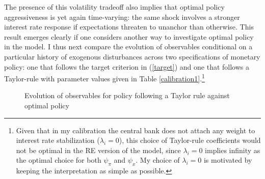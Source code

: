 \documentclass[11pt]{article}
\def \myFigPath {../../figures/}
\renewcommand{\[}{\begin{equation}}
\renewcommand{\]}{\end{equation}}
\def\fignamePEAobsTR{implement_anchTC_obs_TR_approx29_Jul_2020}
\def\fignamePEAobsAnch{implement_anchTC_obs_approx17_Jul_2020}
\begin{document}
The presence of this volatility tradeoff also implies that optimal policy aggressiveness is yet again time-varying: the same shock involves a stronger interest rate response if expectations threaten to unanchor than otherwise. This result emerges clearly if one considers another way to investigate optimal policy in the model. I thus next compare the evolution of observables conditional on a particular history of exogenous disturbances across two specifications of monetary policy: one that follows the target criterion in (\ref{target}) and one that follows a Taylor-rule with parameter values given in Table \ref{calibration1}.\footnote{Given that in my calibration the central bank does not attach any weight to interest rate stabilization ($\lambda_i=0$), this choice of Taylor-rule coefficients would not be optimal in the RE version of the model, since $\lambda_i=0$ implies infinity as the optimal choice for both $\psi_{\pi}$ and $\psi_x$. My choice of $\lambda_i=0$ is motivated by keeping the interpretation as simple as possible.}

\begin{figure}[h!]
\hfill %
\caption{Evolution of observables for policy following a Taylor rule against optimal policy}
\label{pea_TCvsTR}
\end{figure}
\end{document}
